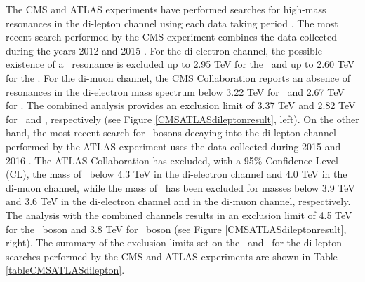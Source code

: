 \begin{itemize}
\noindent The CMS and ATLAS experiments have performed searches for high-mass resonances in
the di-lepton channel using each data taking period \cite{CMSZprimetodileptonrun1run2, CMSZprimetodileptonrun1, CMSZprimetodileptonrun1sqrt7,
ATLASZprimetodileptonrun2, ATLASZprimetodilepton2015, ATLASZprimetodilepton2012, ATLASZprimetodileptonrun1}. The most recent
search performed by the CMS experiment combines the data collected during the years 2012 and 
2015 \cite{CMSZprimetodileptonrun1run2}. For the di-electron channel, the possible 
existence of a \Zprime~resonance is excluded up to 2.95 TeV for the \ZprimeSSM~and up to 
2.60 TeV for the \Zprimepsi. For the di-muon channel, the CMS Collaboration
 reports an absence of resonances in the di-electron mass spectrum below 3.22
TeV for \ZprimeSSM~and 2.67 TeV for \Zprimepsi. The combined analysis
provides an exclusion limit of 3.37 TeV and 2.82 TeV for \ZprimeSSM~and 
\Zprimepsi, respectively (see Figure \ref{CMSATLASdileptonresult}, left). On the other hand, 
the most recent search for \Zprime~bosons decaying into the di-lepton channel performed 
by the ATLAS experiment uses the data collected during 2015 and 2016 \cite{ATLASZprimetodileptonrun2}. The ATLAS 
Collaboration has excluded, with a 95$\%$ Confidence Level (CL), the mass of \ZprimeSSM~below 4.3 TeV in the
di-electron channel and 4.0 TeV in the di-muon channel, while the mass of \Zprimepsi~has been excluded for masses
below 3.9 TeV and 3.6 TeV in the di-electron channel and in the di-muon channel, respectively. The analysis with the 
combined channels results in an exclusion limit of 4.5 TeV for the \ZprimeSSM~boson and 3.8 TeV for 
\Zprimepsi~boson (see Figure \ref{CMSATLASdileptonresult}, right). The summary of the exclusion 
limits set on the \ZprimeSSM~and \Zprimepsi~for the di-lepton searches performed
by the CMS and ATLAS experiments are shown in Table \ref{tableCMSATLASdilepton}.\\


\begin{table}[ht]
\begin{center}
\begin{tabular}{|c|c|c|c|c|}   \hline   \hline
        

\end{tabular}
\end{center}
\end{table}
\end{itemize}
